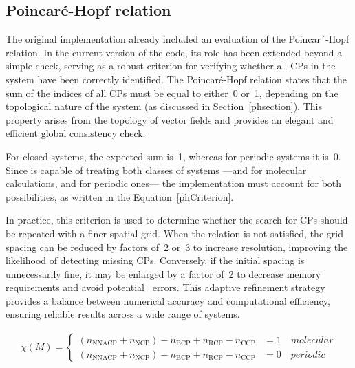\newpage
\vspace*{1.5cm}%

\newpage

\subsection{Poincaré-Hopf relation}

The original implementation already included an evaluation of the
Poincar´-Hopf relation. In the current version of the code, its role has been
extended beyond a simple check, serving as a robust criterion for verifying
whether all \glspl{CP} in the system have been correctly identified. The
Poincaré-Hopf relation states that the sum of the indices of all \glspl{CP}
must be equal to either~0 or~1, depending on the topological nature of the
system (as discussed in Section~\ref{phsection}). This property arises from the
topology of vector fields and provides an elegant and efficient global
consistency check.

For closed systems, the expected sum is~1, whereas for
periodic systems it is~0. Since \ams is capable of treating both classes of
systems ---\adf and \dftb for molecular calculations, and \band for periodic
ones--- the implementation must account for both possibilities, as
written in the Equation~\ref{phCriterion}.

In practice, this criterion is used to determine whether the search for
\glspl{CP} should be repeated with a finer spatial grid. When the
relation is not satisfied, the grid spacing can be reduced by factors of~2 or~3
to increase resolution, improving the likelihood of detecting missing
\glspl{CP}. Conversely, if the initial spacing is unnecessarily fine, it may be
enlarged by a factor of~2 to decrease memory requirements and avoid potential
\overflow\ errors. This adaptive refinement strategy provides a balance between
numerical accuracy and computational efficiency, ensuring reliable results
across a wide range of systems.

\begin{align}
  \chi(M) =
  \begin{cases}
    (n_{\text{NNACP}} + n_{\text{NCP}}) - n_{\text{BCP}} + n_{\text{RCP}} - n_{\text{CCP}} &= 1 \quad molecular\\
    (n_{\text{NNACP}} + n_{\text{NCP}}) - n_{\text{BCP}} + n_{\text{RCP}} - n_{\text{CCP}} &= 0 \quad periodic
  \end{cases}
  \label{phCriterion}
\end{align}

